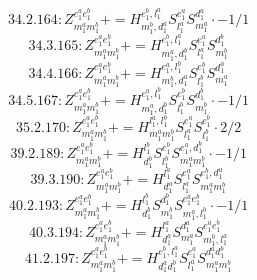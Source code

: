 \documentclass[letterpaper,10pt,fleqn,leqno,onecolumn]{article}
\begin{document}
\begin{equation} \;\;\;\;\;\;  34.2.164: Z^{e_{1}^{a}e_{1}^{b}}_{m_{1}^{a}m_{1}^{b}}+=H^{e_{1}^{b},l_{1}^{a}}_{m_{1}^{b},d_{1}^{a}}S^{e_{1}^{a}}_{l_{1}^{a}}S^{d_{1}^{a}}_{m_{1}^{a}}\cdot -1/1 \end{equation}
\begin{equation} \;\;\;\;\;\;  34.3.165: Z^{e_{1}^{a}e_{1}^{b}}_{m_{1}^{a}m_{1}^{b}}+=H^{e_{1}^{b},l_{1}^{a}}_{m_{1}^{a},d_{1}^{b}}S^{e_{1}^{a}}_{l_{1}^{a}}S^{d_{1}^{b}}_{m_{1}^{b}} \end{equation}
\begin{equation} \;\;\;\;\;\;  34.4.166: Z^{e_{1}^{a}e_{1}^{b}}_{m_{1}^{a}m_{1}^{b}}+=H^{e_{1}^{a},l_{1}^{b}}_{m_{1}^{b},d_{1}^{a}}S^{e_{1}^{b}}_{l_{1}^{b}}S^{d_{1}^{a}}_{m_{1}^{a}} \end{equation}
\begin{equation} \;\;\;\;\;\;  34.5.167: Z^{e_{1}^{a}e_{1}^{b}}_{m_{1}^{a}m_{1}^{b}}+=H^{e_{1}^{a},l_{1}^{b}}_{m_{1}^{a},d_{1}^{b}}S^{e_{1}^{b}}_{l_{1}^{b}}S^{d_{1}^{b}}_{m_{1}^{b}}\cdot -1/1 \end{equation}
\begin{equation} \;\;\;\;\;\;  35.2.170: Z^{e_{1}^{a}e_{1}^{b}}_{m_{1}^{a}m_{1}^{b}}+=H^{l_{1}^{a},l_{1}^{b}}_{m_{1}^{a}m_{1}^{b}}S^{e_{1}^{a}}_{l_{1}^{a}}S^{e_{1}^{b}}_{l_{1}^{b}}\cdot 2/2 \end{equation}
\begin{equation} \;\;\;\;\;\;  39.2.189: Z^{e_{1}^{a}e_{1}^{b}}_{m_{1}^{a}m_{1}^{b}}+=H^{l_{1}^{b}}_{d_{1}^{b}}S^{e_{1}^{b}}_{l_{1}^{b}}S^{e_{1}^{a},d_{1}^{b}}_{m_{1}^{a}m_{1}^{b}}\cdot -1/1 \end{equation}
\begin{equation} \;\;\;\;\;\;  39.3.190: Z^{e_{1}^{a}e_{1}^{b}}_{m_{1}^{a}m_{1}^{b}}+=H^{l_{1}^{a}}_{d_{1}^{a}}S^{e_{1}^{a}}_{l_{1}^{a}}S^{e_{1}^{b},d_{1}^{a}}_{m_{1}^{a}m_{1}^{b}} \end{equation}
\begin{equation} \;\;\;\;\;\;  40.2.193: Z^{e_{1}^{a}e_{1}^{b}}_{m_{1}^{a}m_{1}^{b}}+=H^{l_{1}^{b}}_{d_{1}^{b}}S^{d_{1}^{b}}_{m_{1}^{b}}S^{e_{1}^{a}e_{1}^{b}}_{m_{1}^{a},l_{1}^{b}}\cdot -1/1 \end{equation}
\begin{equation} \;\;\;\;\;\;  40.3.194: Z^{e_{1}^{a}e_{1}^{b}}_{m_{1}^{a}m_{1}^{b}}+=H^{l_{1}^{a}}_{d_{1}^{a}}S^{d_{1}^{a}}_{m_{1}^{a}}S^{e_{1}^{a}e_{1}^{b}}_{m_{1}^{b},l_{1}^{a}} \end{equation}
\begin{equation} \;\;\;\;\;\;  41.2.197: Z^{e_{1}^{a}e_{1}^{b}}_{m_{1}^{a}m_{1}^{b}}+=H^{e_{1}^{b},l_{1}^{a}}_{d_{1}^{a}d_{1}^{b}}S^{e_{1}^{a}}_{l_{1}^{a}}S^{d_{1}^{a}d_{1}^{b}}_{m_{1}^{a}m_{1}^{b}} \end{equation}
\end{document}
